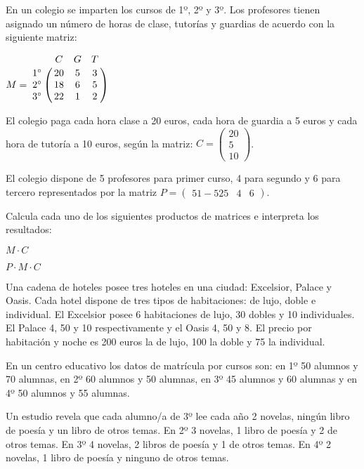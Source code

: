 \begin{ejer} 
En un colegio se imparten los cursos de 1º, 2º y 3º. Los profesores tienen asignado un número de horas de clase, tutorías y guardias de acuerdo con la siguiente matriz:

$M=\bordermatrix{
& C & G & T \cr
1\g & 20 & 5 & 3 \cr
2\g & 18 & 6 & 5 \cr
3\g & 22 & 1 & 2 } $

El colegio paga cada hora clase a 20 euros, cada hora de guardia a 5 euros y cada hora de tutoría a 10 euros, según la matriz: $C=\begin{pmatrix}
20 \\
5 \\
10
\end{pmatrix} $.

El colegio dispone de 5 profesores para primer curso, 4 para segundo y 6 para tercero representados por la matriz $P=\begin{pmatrix}51-52
5 & 4 & 6
\end{pmatrix}$.

Calcula cada uno de los siguientes productos de matrices e interpreta los resultados:

\bex
{}
\item {$M \cdot C$}{}
\item {$P \cdot M \cdot C$}{}
\eex
\end{ejer}

\begin{ejer} 
 Una cadena de hoteles posee tres hoteles en una ciudad: Excelsior, Palace y Oasis. Cada hotel dispone de tres tipos de habitaciones: de lujo, doble e individual. El Excelsior posee 6 habitaciones de lujo, 30 dobles y 10 individuales. El Palace 4, 50 y 10 respectivamente y el Oasis 4, 50 y 8. El precio por habitación y noche es 200 euros la de lujo, 100 la doble y 75 la individual.

\bex
{}
\eex
\end{ejer}

\begin{ejer}  En un centro educativo los datos de matrícula por cursos son: en 1º 50 alumnos y 70 alumnas, en 2º 60 alumnos y 50 alumnas, en 3º 45 alumnos y 60 alumnas y en 4º 50 alumnos y 55 alumnas.

Un estudio revela que cada alumno/a de 3º lee cada año 2 novelas, ningún libro de poesía y un libro de otros temas. En 2º 3 novelas, 1 libro de poesía y 2 de otros temas. En 3º 4 novelas, 2 libros de poesía y 1 de otros temas. En 4º 2 novelas, 1 libro de poesía y ninguno de otros temas.
\bex
{}
\eex

\end{ejer}


